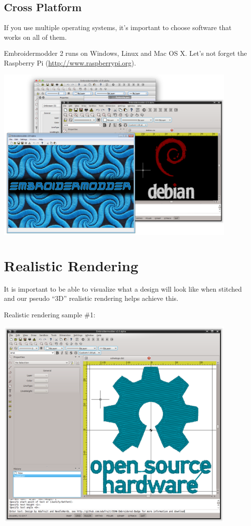 \subsection{Cross Platform}

If you use multiple operating systems, it's important to choose software that works on all of them.

Embroidermodder 2 runs on Windows, Linux and Mac OS X. Let's not forget the Raspberry Pi (\url{http://www.raspberrypi.org}).

\includegraphics[width=0.9\textwidth]{images/features-platforms-1.png}

\section{Realistic Rendering}

It is important to be able to visualize what a design will look like when stitched and our pseudo ``3D'' realistic rendering helps achieve this.

Realistic rendering sample \#1:

\includegraphics[width=0.9\textwidth]{images/features-realrender-1.png}

